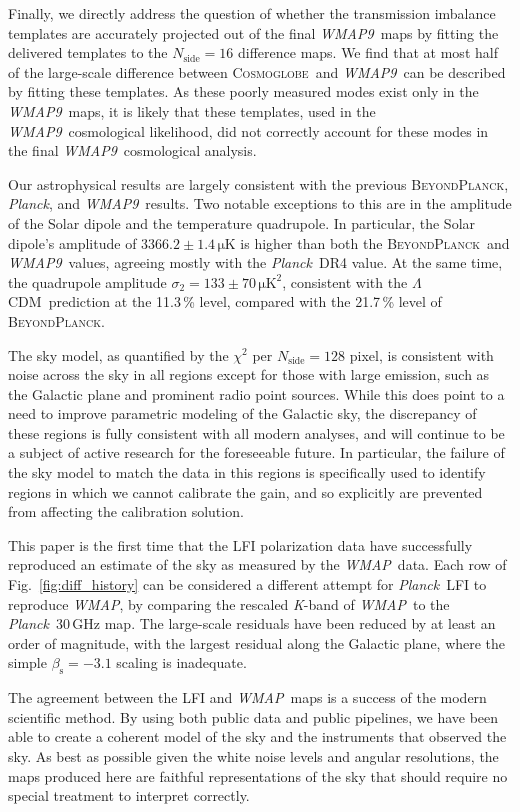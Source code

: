 \documentclass[twocolumn]{../../common/aa}
\def\WMAP{\emph{WMAP}}
\def\WMAPnine{\emph{WMAP9}}
\def\planck{\emph{Planck}}
\def\Planck{\emph{Planck}}
\def\LCDM{$\Lambda$CDM}
\newcommand{\bp}{\textsc{BeyondPlanck}}
\newcommand{\cosmoglobe}{\textsc{Cosmoglobe}}
\newcommand{\K}[0]{\textit K}
\begin{document}
Finally, we directly address the question of whether the transmission imbalance templates are accurately projected out of the final \WMAPnine\ maps by fitting the delivered templates to the $N_\mathrm{side}=16$ difference maps. We find that at most half of the large-scale difference between \cosmoglobe\ and \WMAPnine\ can be described by fitting these templates. As these poorly measured modes exist only in the \WMAPnine\ maps, it is likely that these templates, used in the \WMAPnine\ cosmological likelihood, did not correctly account for these modes in the final \WMAPnine\ cosmological analysis.

Our astrophysical results are largely consistent with the previous \bp, \planck, and \WMAPnine\ results. Two notable exceptions to this are in the amplitude of the Solar dipole and the temperature quadrupole. In particular, the Solar dipole's amplitude of $3366.2\pm1.4\,\mathrm{\mu K}$ is higher than both the \bp\ and \WMAPnine\ values, agreeing mostly with the \planck\ DR4 value. At the same time, the quadrupole amplitude $\sigma_2=133\pm70\,\mathrm{\mu K^2}$, consistent with the \LCDM\ prediction at the 11.3\,\% level, compared with the 21.7\,\% level of \bp.

The sky model, as quantified by the $\chi^2$ per $N_\mathrm{side}=128$ pixel, is consistent with noise across the sky in all regions except for those with large emission, such as the Galactic plane and prominent radio point sources. While this does point to a need to improve parametric modeling of the Galactic sky, the discrepancy of these regions is fully consistent with all modern analyses, and will continue to be a subject of active research for the foreseeable future. In particular, the failure of the sky model to match the data in this regions is specifically used to identify regions in which we cannot calibrate the gain, and so explicitly are prevented from affecting the calibration solution.


This paper is the first time that the LFI polarization data have successfully reproduced an estimate of the sky as measured by the \WMAP\ data. Each row of Fig.~\ref{fig:diff_history} can be considered a different attempt for \Planck\ LFI to reproduce \WMAP, by comparing the rescaled \K-band of \WMAP\ to the \Planck\ 30\,GHz map. The large-scale residuals have been reduced by at least an order of magnitude, with the largest residual along the Galactic plane, where the simple $\beta_\mathrm s=-3.1$ scaling is inadequate.

The agreement between the LFI and \WMAP\ maps is a success of the modern scientific method. By using both public data and public pipelines, we have been able to create a coherent model of the sky and the instruments that observed the sky. As best as possible given the white noise levels and angular resolutions, the maps produced here are faithful representations of the sky that should require no special treatment to interpret correctly.
\end{document}
